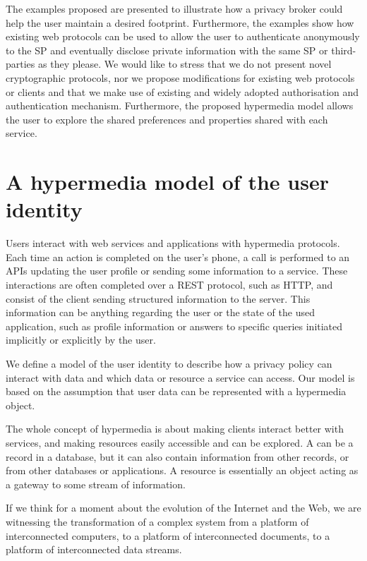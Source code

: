 The examples proposed are presented to illustrate how a privacy broker could help the user maintain a desired footprint. Furthermore, the examples show how existing web protocols can be used to allow the user to authenticate anonymously to the SP and eventually disclose private information with the same SP or third-parties as they please. We would like to stress that we do not present novel cryptographic protocols, nor we propose modifications for existing web protocols or clients and that we make use of existing and widely adopted authorisation and authentication mechanism. Furthermore, the proposed hypermedia model allows the user to explore the shared preferences and properties shared with each service.

\section{A hypermedia model of the user identity}

Users interact with web services and applications with hypermedia protocols. Each time an action is completed on the user's phone, a call is performed to an APIs updating the user profile or sending some information to a service. These interactions are often completed over a REST protocol, such as HTTP, and consist of the client sending structured information to the server. This information can be anything regarding the user or the state of the used application, such as profile information or answers to specific queries initiated implicitly or explicitly by the user.

We define a model of the user identity to describe how a privacy policy can interact with data and which data or resource a service can access. Our model is based on the assumption that user data can be represented with a hypermedia object. 

The whole concept of hypermedia is about making clients interact better with services, and making resources easily accessible and can be explored. A can be a record in a database, but it can also contain information from other records, or from other databases or applications. A resource is essentially an object acting as a gateway to some stream of information.

If we think for a moment about the evolution of the Internet and the Web, we are witnessing the transformation of a complex system from a platform of interconnected computers, to a platform of interconnected documents, to a platform of interconnected data streams. 

